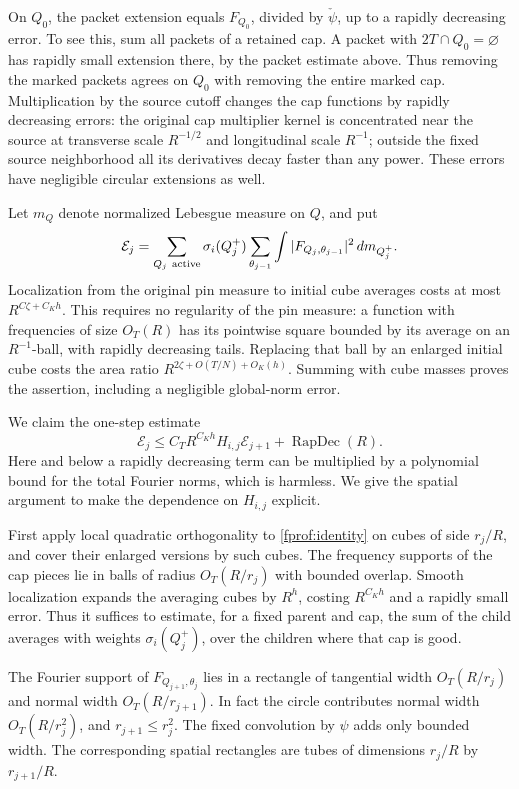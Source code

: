 On \(Q_0\), the packet extension equals \(F_{Q_0}\), divided by \(\check\psi\), up to a rapidly decreasing error. To see this, sum all packets of a retained cap. A packet with \(2T\cap Q_0=\varnothing\) has rapidly small extension there, by the packet estimate above. Thus removing the marked packets agrees on \(Q_0\) with removing the entire marked cap. Multiplication by the source cutoff changes the cap functions by rapidly decreasing errors: the original cap multiplier kernel is concentrated near the source at transverse scale \(R^{-1/2}\) and longitudinal scale \(R^{-1}\); outside the fixed source neighborhood all its derivatives decay faster than any power. These errors have negligible circular extensions as well.

Let \(m_Q\) denote normalized Lebesgue measure on \(Q\), and put
$$
 \mathcal E_j=
 \sum_{Q_j\ {\rm active}}\sigma_i(Q_j^+)
 \sum_{\theta_{j-1}}\int |F_{Q_j,\theta_{j-1}}|^2\,d m_{Q_j^+}.
$$
Localization from the original pin measure to initial cube averages costs at most \(R^{C\zeta+C_Kh}\). This requires no regularity of the pin measure: a function with frequencies of size \(O_T(R)\) has its pointwise square bounded by its average on an \(R^{-1}\)-ball, with rapidly decreasing tails. Replacing that ball by an enlarged initial cube costs the area ratio \(R^{2\zeta+O(T/N)+O_K(h)}\). Summing with cube masses proves the assertion, including a negligible global-norm error.

We claim the one-step estimate
\begin{equation}\label{fprof:inflation}
 \mathcal E_j\leq C_T R^{C_Kh}H_{i,j}\mathcal E_{j+1}
                  +\operatorname{RapDec}(R).
\end{equation}
Here and below a rapidly decreasing term can be multiplied by a polynomial bound for the total Fourier norms, which is harmless. We give the spatial argument to make the dependence on \(H_{i,j}\) explicit.

First apply local quadratic orthogonality to \eqref{fprof:identity} on cubes of side \(r_j/R\), and cover their enlarged versions by such cubes. The frequency supports of the cap pieces lie in balls of radius \(O_T(R/r_j)\) with bounded overlap. Smooth localization expands the averaging cubes by \(R^h\), costing \(R^{C_Kh}\) and a rapidly small error. Thus it suffices to estimate, for a fixed parent and cap, the sum of the child averages with weights \(\sigma_i(Q_j^+)\), over the children where that cap is good.

The Fourier support of \(F_{Q_{j+1},\theta_j}\) lies in a rectangle of tangential width \(O_T(R/r_j)\) and normal width \(O_T(R/r_{j+1})\). In fact the circle contributes normal width \(O_T(R/r_j^2)\), and \(r_{j+1}\leq r_j^2\). The fixed convolution by \(\psi\) adds only bounded width. The corresponding spatial rectangles are tubes of dimensions \(r_j/R\) by \(r_{j+1}/R\).

